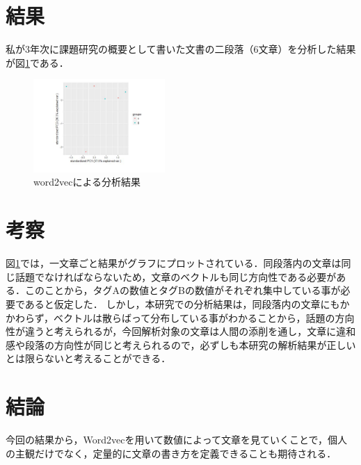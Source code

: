 \documentclass[uplatex,twocolumn,dvipdfmx]{jsarticle}
\begin{document}
\section{結果}
私が3年次に課題研究の概要として書いた文書の二段落（6文章）を分析した結果が図\ref{分析結果}である．
\begin{figure}[h]
\centering
\includegraphics[width=5cm]{02.pdf}
\caption{word2vecによる分析結果}\label{分析結果}
\end{figure}

\section{考察}
図\ref{分析結果}では，一文章ごと結果がグラフにプロットされている．同段落内の文章は同じ話題でなければならないため，文章のベクトルも同じ方向性である必要がある．このことから，タグAの数値とタグBの数値がそれぞれ集中している事が必要であると仮定した．
しかし，本研究での分析結果は，同段落内の文章にもかかわらず，ベクトルは散らばって分布している事がわかることから，話題の方向性が違うと考えられるが，今回解析対象の文章は人間の添削を通し，文章に違和感や段落の方向性が同じと考えられるので，必ずしも本研究の解析結果が正しいとは限らないと考えることができる．

\section{結論}

今回の結果から，Word2vecを用いて数値によって文章を見ていくことで，個人の主観だけでなく，定量的に文章の書き方を定義できることも期待される．


\end{document}

